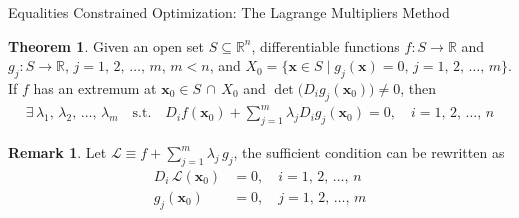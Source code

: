 \documentclass[10pt,handout]{beamer}
\newcommand{\ds}{\displaystyle}
\theoremstyle{definition}
\newtheorem*{thm}{Theorem}
\newtheorem*{rmk}{Remark}
\newcommand{\vx}{\mathbf{x}}
\begin{document}
\begin{frame}{Equalities Constrained Optimization: The Lagrange Multipliers Method}


\begin{thm}%
  Given an open set $S\subseteq\mathbb{R}^n$, differentiable functions $f:S\to\mathbb{R}$ and $g_j:S\to\mathbb{R}$, $j=1,\,2,\,\ldots,\,m$, $m < n$, and $\ds X_0 = \big\{\vx\in S\;|\;g_j(\vx) = 0,\,j=1,\,2,\,\ldots,\,m\big\}$. If $f$ has an extremum at $\ds\vx_0\in S\,\cap\,X_0$ and $\det\big(D_i g_j(\vx_0)\big)\ne 0$, then
  \begin{align*}
    \exists\,\lambda_1,\,\lambda_2,\,\ldots,\,\lambda_m\quad\text{s.t.}\quad D_i f(\vx_0) + \sum_{j = 1}^m\lambda_j D_i g_j(\vx_0) = 0,\quad\ds i = 1,\,2,\,\ldots,\,n
  \end{align*}
\end{thm}
\begin{rmk}
  Let $\ds\mathcal{L}\equiv f + \sum_{j = 1}^m \lambda_j\,g_j$, the sufficient condition can be rewritten as
  \begin{align*}
    D_i\,\mathcal{L}(\vx_0) &= 0,\quad i = 1,\,2,\,\ldots,\,n \\
    g_j(\vx_0) &= 0,\quad j=1,\,2,\,\ldots,\,m
  \end{align*}
\end{rmk}
\end{frame}
\end{document}

